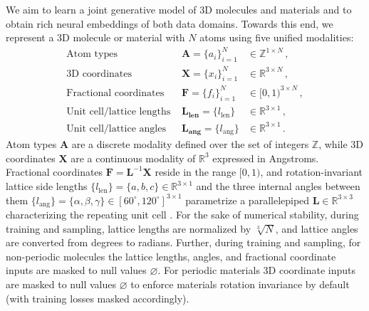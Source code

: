 \documentclass{article}
\theoremstyle{plain}
\theoremstyle{definition}
\theoremstyle{remark}
\begin{document}
We aim to learn a joint generative model of 3D molecules and materials and to obtain rich neural embeddings of both data domains. Towards this end, we represent a 3D molecule or material with $N$ atoms using five unified modalities:
\begin{align*}
    \text{Atom types } & \bm{A} = \{a_i\}_{i=1}^N & \in \mathbb{Z}^{1 \times N} \, , \\
    \text{3D coordinates } & \bm{X} = \{x_i\}_{i=1}^N & \in \mathbb{R}^{3 \times N} \, , \\
    \text{Fractional coordinates } & \bm{F} = \{f_i\}_{i=1}^N & \in [0, 1)^{3 \times N} \, , \\
    \text{Unit cell/lattice lengths } & \bm{L_\text{len}} = \{l_\text{len}\} & \in \mathbb{R}^{3 \times 1} \, , \\
    \text{Unit cell/lattice angles } & \bm{L_\text{ang}} = \{l_\text{ang}\} & \in \mathbb{R}^{3 \times 1} \, .
\end{align*}
Atom types $\bm{A}$ are a discrete modality defined over the set of integers $\mathbb{Z}$, while 3D coordinates $\bm{X}$ are a continuous modality of $\mathbb{R}^3$ expressed in Angstroms. Fractional coordinates $\bm{F} = \bm{L}^{-1}\bm{X}$ reside in the range $[0, 1)$, and rotation-invariant lattice side lengths $\{l_\text{len}\} = \{a, b, c\} \in \mathbb{R}^{3 \times 1}$ and the three internal angles between them $\{l_\text{ang}\} = \{\alpha, \beta, \gamma\} \in [60^{\circ}, 120^{\circ}]^{3 \times 1}$ parametrize a parallelepiped $\bm{L} \in \mathbb{R}^{3 \times 3}$ \citep{grosse2004numerically} characterizing the repeating unit cell \citep{miller2024flowmm}. For the sake of numerical stability, during training and sampling, lattice lengths are normalized by $\sqrt[3]{N}$, and lattice angles are converted from degrees to radians. Further, during training and sampling, for non-periodic molecules the lattice lengths, angles, and fractional coordinate inputs are masked to null values $\varnothing$. For periodic materials 3D coordinate inputs are masked to null values $\varnothing$ to enforce materials rotation invariance by default (with training losses masked accordingly).

\end{document}

